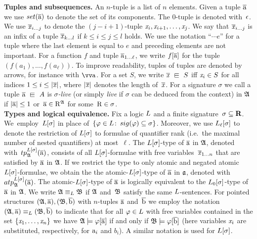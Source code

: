 \noindent \textbf{Tuples and subsequences.}
An $n$-tuple is a list of $n$ elements.
Given a tuple $\overline{\mathrm{a}}$ we use $\set(\elemtuplea)$ to denote the set of its components. 
The $0$-tuple is denoted with~$\epsilon$.
We use $\overline{\mathit{x}}_{i\ldots j}$ to denote the $(j{-}i{+}1)$-tuple $\mathit{x}_i, \mathit{x}_{i+1}, \ldots, \mathit{x}_j$.
We say that $\overline{\mathit{x}}_{i\ldots j}$ is an infix of a tuple $\overline{\mathit{x}}_{k\ldots l}$ if $k \leq i \leq j \leq l$ holds.
We use the notation ``$\cdots e$'' for a tuple where the last element is equal to $e$ and preceding elements are not important.
For a function $f$ and tuple $\overline{\mathrm{a}}_{1\ldots\ell}$, we write $f[\overline{\mathrm{a}}]$ for the tuple $(f(a_{1}), \ldots, f(a_{\ell}))$.
To improve readability, tuples of tuples are denoted by arrows, for instance with $\elemtuptuplea$.
For a set $S$, we write $\vartuplex \sqin S$ iff $\mathit{x}_i \in S$ for all indices $1 \leq i \leq |\overline{\mathit{x}}|$, where $|\overline{\mathit{x}}|$ denotes the length of~$\overline{\mathit{x}}$. 
For a signature $\sigma$ we call a tuple $\elemtuplea \sqin A$ is \emph{$\sigma$-live} (or simply \emph{live} if $\sigma$ can be deduced from the context) in ${\mathfrak{A}}$ if $|\overline{\mathrm{a}}| \leq 1$ or~$\overline{\mathrm{a}} \in \mathrm{R}^{{\mathfrak{A}}}$ for some~$\mathrm{R} \in \sigma$.\\ 

\noindent \textbf{Types and logical equivalence.}
Fix a logic $\logicL$ and a finite signature~$\sigma \subseteq \mathbf{R}$. 
We~employ~$\logicL[\sigma]$ in place of~$\{ \varphi \in \logicL \colon\,  \sig(\varphi) \subseteq \sigma \}$.
Moreover, we use $\logicL_\ell[\sigma]$ to denote the restriction of $\logicL[\sigma]$ to formulae of quantifier rank (i.e.\ the maximal number of nested quantifiers) at most~$\ell$.  
%
The $\logicL[\sigma]$-type of $\overline{\mathrm{a}}$ in ${\mathfrak{A}}$, denoted with~$\tp{\logicL[\sigma]}{\str{A}}{\elemtuplea}$, consists of all $\logicL[\sigma]$-formulae with free variables~$\overline{\mathit{x}}_{1\ldots n}$ that are satisfied by $\overline{\mathrm{a}}$ in ${\mathfrak{A}}$.
If we restrict the type to only atomic and negated atomic $\logicL[\sigma]$-formulae, we obtain the the atomic-$\logicL[\sigma]$-type of $\overline{\mathrm{a}}$ in ${\mathfrak{a}}$, denoted with~$\atp{\logicL[\sigma]}{\str{A}}{\elemtuplea}$.
The atomic-$\logicL[\sigma]$-type of $\overline{\mathrm{a}}$ is logically equivalent to the $\logicL_{0}[\sigma]$-type of $\overline{\mathrm{a}}$ in ${\mathfrak{A}}$.
We write $\str{A} \equiv_\logicL \str{B}$ if ${\mathfrak{A}}$ and~${\mathfrak{B}}$ satisfy the same $\logicL$-sentences.
For pointed structures $({\mathfrak{A}}, \overline{\mathrm{a}}), ({\mathfrak{B}}, \overline{\mathrm{b}})$ with $n$-tuples $\overline{\mathrm{a}}$ and~$\overline{\mathrm{b}}$ we employ the notation $(\str{A}, \elemtuplea) \equiv_\logicL (\str{B}, \elemtupleb)$ to indicate that for all $\varphi \in \logicL$ with free variables contained in the set $\{ \mathit{x}_1, \ldots, \mathit{x}_n \}$ we have ${\mathfrak{A}} \models \varphi[\overline{\mathrm{a}}]$ if and only if ${\mathfrak{B}} \models \varphi[\overline{\mathrm{b}}]$ (here variables $\mathit{x}_i$ are substituted, respectively, for $\mathrm{a}_i$ and $b_i$).
A similar notation is used for $\logicL[\sigma]$.\\

